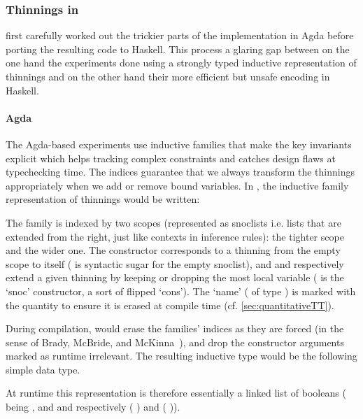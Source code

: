 \subsubsection{Thinnings in \typos}

\iftoggle{BLIND}{The authors}{We}
first carefully worked out the trickier parts of the implementation in Agda before
porting the resulting code to Haskell.
%
This process \iftoggle{BLIND}{highlights}{highlighted}
a glaring gap between on the one hand the experiments done
using a strongly typed inductive representation of thinnings and on the other hand
their more efficient but unsafe encoding in Haskell.

\paragraph{Agda}
The Agda-based experiments use inductive families that make the key invariants
explicit which helps tracking complex constraints and catches design flaws at
typechecking time.
%
The indices guarantee that we always transform the thinnings appropriately when
we add or remove bound variables. In \idris{}, the inductive family representation
of thinnings would be written:

%
The  family is indexed by two scopes (represented as snoclists
i.e. lists that are extended from the right, just like contexts in inference rules):
 the tighter scope and  the wider one.
%
The  constructor corresponds to a thinning from the empty scope to
itself (\IdrisData{[<]} is \idris{} syntactic sugar for the empty snoclist),
and  and  respectively extend a given thinning
by keeping or dropping the most local variable (\IdrisData{:<} is the `snoc'
constructor, a sort of flipped `cons').
%
The `name' ( of type ) is marked with the quantity
 to ensure it is erased at compile time (cf. \cref{sec:quantitativeTT}).

During compilation, \idris{} would erase the families' indices as they are forced
(in the sense of Brady, McBride, and McKinna~\cite{DBLP:conf/types/BradyMM03}),
and drop the constructor arguments marked as runtime irrelevant.
%
The resulting inductive type would be the following simple data type.


At runtime this representation is therefore essentially a linked list of booleans
( being , and  and 
respectively ( \IdrisData{::}) and ( \IdrisData{::})).

